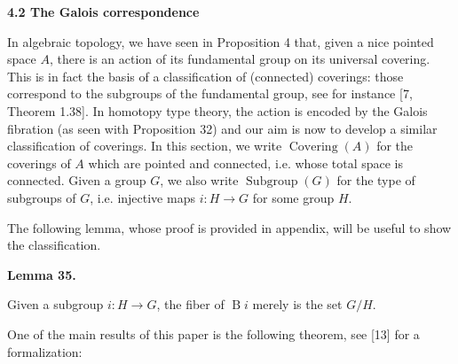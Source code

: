 \documentclass[10pt,a4paper]{article}
\begin{document}
 
 
 
 
\par\medskip\noindent\textbf{4.2 The Galois correspondence}\par
 
 
In algebraic topology, we have seen in Proposition 4 that, given a nice pointed space $A$, there is an action of its fundamental group on its universal covering. This is in fact the basis of a classification of (connected) coverings: those correspond to the subgroups of the fundamental group, see for instance [7, Theorem 1.38]. In homotopy type theory, the action is encoded by the Galois fibration (as seen with Proposition 32) and our aim is now to develop a similar classification of coverings. In this section, we write $\operatorname{Covering}(A)$ for the coverings of $A$ which are pointed and connected, i.e. whose total space is connected. Given a group $G$, we also write $\operatorname{Subgroup}(G)$ for the type of subgroups of $G$, i.e. injective maps $i:H\to G$ for some group $H$.\par
 
 
 
The following lemma, whose proof is provided in appendix, will be useful to show the classification.\par
 
 
 
\par\medskip\noindent\textbf{Lemma 35.}\par
 
 
Given a subgroup $i:H\to G$, the fiber of $\operatorname{B}i$ merely is the set $G/H$.\par
 
 
 
 
One of the main results of this paper is the following theorem, see [13] for a formalization:\par
 
 
\end{document}
